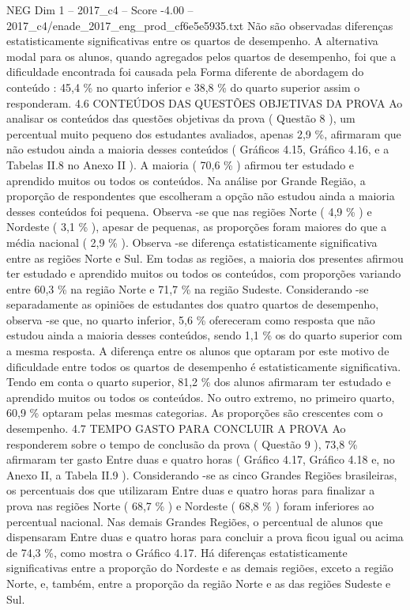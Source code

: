 \begin{textsample}{NEG Dim 1 – 2017\_c4 – Score -4.00 – 2017\_c4/enade\_2017\_eng\_prod\_cf6e5e5935.txt}
Não são observadas diferenças estatisticamente significativas entre os quartos de desempenho.
A alternativa modal para os alunos, quando agregados pelos quartos de desempenho, foi que a dificuldade encontrada foi causada pela Forma diferente de abordagem do conteúdo : 45,4 \% no quarto inferior e 38,8 \% do quarto superior assim o responderam. 4.6 CONTEÚDOS DAS QUESTÕES OBJETIVAS DA PROVA Ao analisar os conteúdos das questões objetivas da prova ( Questão 8 ), um percentual muito pequeno dos estudantes avaliados, apenas 2,9 \%, afirmaram que não estudou ainda a maioria desses conteúdos ( Gráficos 4.15, Gráfico 4.16, e a Tabelas II.8 no Anexo II ).
A maioria ( 70,6 \% ) afirmou ter estudado e aprendido muitos ou todos os conteúdos.
Na análise por Grande Região, a proporção de respondentes que escolheram a opção não estudou ainda a maioria desses conteúdos foi pequena.
Observa -se que nas regiões Norte ( 4,9 \% ) e Nordeste ( 3,1 \% ), apesar de pequenas, as proporções foram maiores do que a média nacional ( 2,9 \% ).
Observa -se diferença estatisticamente significativa entre as regiões Norte e Sul.
Em todas as regiões, a maioria dos presentes afirmou ter estudado e aprendido muitos ou todos os conteúdos, com proporções variando entre 60,3 \% na região Norte e 71,7 \% na região Sudeste.
Considerando -se separadamente as opiniões de estudantes dos quatro quartos de desempenho, observa -se que, no quarto inferior, 5,6 \% ofereceram como resposta que não estudou ainda a maioria desses conteúdos, sendo 1,1 \% os do quarto superior com a mesma resposta.
A diferença entre os alunos que optaram por este motivo de dificuldade entre todos os quartos de desempenho é estatisticamente significativa.
Tendo em conta o quarto superior, 81,2 \% dos alunos afirmaram ter estudado e aprendido muitos ou todos os conteúdos.
No outro extremo, no primeiro quarto, 60,9 \% optaram pelas mesmas categorias.
As proporções são crescentes com o desempenho. 4.7 TEMPO GASTO PARA CONCLUIR A PROVA Ao responderem sobre o tempo de conclusão da prova ( Questão 9 ), 73,8 \% afirmaram ter gasto Entre duas e quatro horas ( Gráfico 4.17, Gráfico 4.18 e, no Anexo II, a Tabela II.9 ).
Considerando -se as cinco Grandes Regiões brasileiras, os percentuais dos que utilizaram Entre duas e quatro horas para finalizar a prova nas regiões Norte ( 68,7 \% ) e Nordeste ( 68,8 \% ) foram inferiores ao percentual nacional.
Nas demais Grandes Regiões, o percentual de alunos que dispensaram Entre duas e quatro horas para concluir a prova ficou igual ou acima de 74,3 \%, como mostra o Gráfico 4.17.
Há diferenças estatisticamente significativas entre a proporção do Nordeste e as demais regiões, exceto a região Norte, e, também, entre a proporção da região Norte e as das regiões Sudeste e Sul.

\end{textsample}

